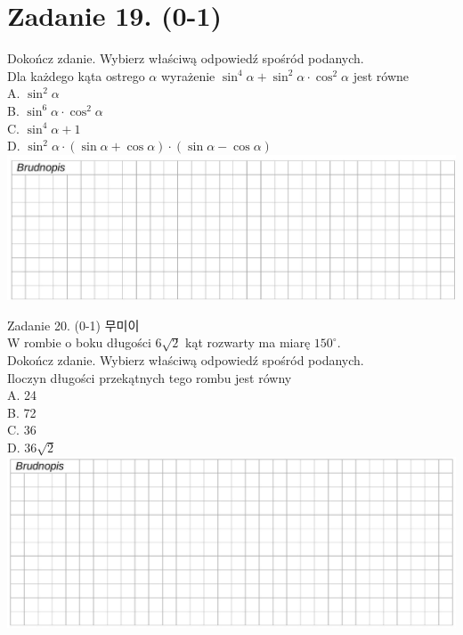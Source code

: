 \documentclass[10pt]{article}
\begin{document}
\section*{Zadanie 19. (0-1)}
Dokończ zdanie. Wybierz właściwą odpowiedź spośród podanych.\\
Dla każdego kąta ostrego \(\alpha\) wyrażenie \(\sin ^{4} \alpha+\sin ^{2} \alpha \cdot \cos ^{2} \alpha\) jest równe\\
A. \(\sin ^{2} \alpha\)\\
B. \(\sin ^{6} \alpha \cdot \cos ^{2} \alpha\)\\
C. \(\sin ^{4} \alpha+1\)\\
D. \(\sin ^{2} \alpha \cdot(\sin \alpha+\cos \alpha) \cdot(\sin \alpha-\cos \alpha)\)\\
\includegraphics[max width=\textwidth, center]{2024_11_21_51cb67544fb9b029f01cg-17(1)}

Zadanie 20. (0-1) 무미이\\
W rombie o boku długości \(6 \sqrt{2}\) kąt rozwarty ma miarę \(150^{\circ}\).\\
Dokończ zdanie. Wybierz właściwą odpowiedź spośród podanych.\\
Iloczyn długości przekątnych tego rombu jest równy\\
A. 24\\
B. 72\\
C. 36\\
D. \(36 \sqrt{2}\)\\
\includegraphics[max width=\textwidth, center]{2024_11_21_51cb67544fb9b029f01cg-18(1)}
\end{document}
